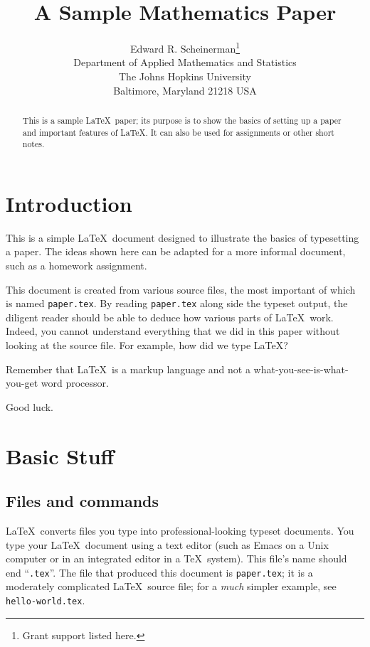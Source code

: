 \documentclass[12pt]{article}
\begin{document}
\nocite{*}

\title{A Sample Mathematics Paper}

\author{Edward R. Scheinerman\thanks{Grant support listed here.} \\ 
Department of Applied Mathematics and Statistics \\
The Johns Hopkins University \\
Baltimore, Maryland 21218 USA}

\maketitle

\begin{abstract}
  This is a sample \LaTeX\ paper; its purpose is to show the basics of
  setting up a paper and important features of \LaTeX. It can also be
  used for assignments or other short notes.
\end{abstract}


\section{Introduction}

This is a simple \LaTeX\ document designed to illustrate the basics of
typesetting a paper. The ideas shown here can be adapted for
a more informal document, such as a homework assignment. 

This document is created from various source files, the most important
of which is named \verb|paper.tex|. By reading \verb|paper.tex| along
side the typeset output, the diligent reader should be able to deduce
how various parts of \LaTeX\ work. Indeed, you cannot understand
everything that we did in this paper without looking at the source
file. For example, how did we type \LaTeX?

Remember that \LaTeX\ is a markup language and not a
what-you-see-is-what-you-get word processor. 

Good luck.

\section{Basic Stuff}
\label{sect:basics}


\subsection{Files and commands}

\LaTeX\ converts files you type into professional-looking typeset
documents. You type your \LaTeX\ document using a text editor (such as
Emacs on a Unix computer or in an integrated editor in a \TeX\
system). This file's name should end ``\verb|.tex|''. The file that
produced this document is \verb|paper.tex|; it is a moderately
complicated \LaTeX\ source file; for a \emph{much} simpler example,
see \verb|hello-world.tex|.
\end{document}
